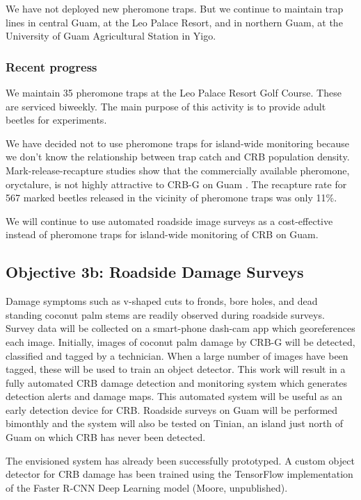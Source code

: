 \documentclass[12pt,letterpaper,english,bibliography=totocnumbered, abstract=on]{scrartcl}
\begin{document}
We have not deployed new pheromone traps. But we continue to maintain trap lines in central Guam, at the Leo Palace Resort, and in northern Guam, at the University of Guam Agricultural Station in Yigo.

\subsubsection{Recent progress}

We maintain 35 pheromone traps at the Leo Palace Resort Golf Course. These are serviced biweekly. The main purpose of this activity is to provide adult beetles for experiments.

We have decided not to use pheromone traps for island-wide monitoring because we don't know the relationship between trap catch and CRB population density. Mark-release-recapture studies show that the commercially available pheromone, oryctalure, is not highly attractive to CRB-G on Guam \cite{siderhurstEffectsUltravioletLight2021}. The recapture rate for 567 marked beetles released in the vicinity of pheromone traps was only 11\%.

We will continue to use automated roadside image surveys as a cost-effective instead of pheromone traps for island-wide monitoring of CRB on Guam. 



\clearpage
\subsection{Objective 3b: Roadside Damage Surveys}

\begin{framed}
Damage symptoms such as v-shaped cuts to fronds, bore holes, and dead standing coconut palm stems are readily observed during roadside surveys. Survey data will be collected on a smart-phone dash-cam app which georeferences each image. Initially, images of coconut palm damage by CRB-G will be detected, classified and tagged by a technician. When a large number of images have been tagged, these will be used to train an object detector. This work will result in a fully automated CRB damage detection and monitoring system which generates detection alerts and damage maps. This automated system will be useful as an early detection device for CRB. Roadside surveys on Guam will be performed bimonthly and the system will also be tested on Tinian, an island just north of Guam on which CRB has never been detected.

The envisioned system has already been successfully prototyped. A custom object detector for CRB damage has been trained using the TensorFlow implementation of the Faster R-CNN Deep Learning model (Moore, unpublished).
\end{framed}
\end{document}
